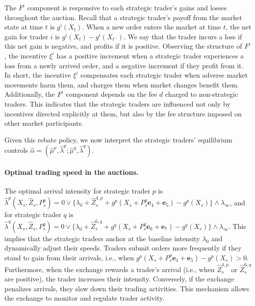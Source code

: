 \documentclass[12pt]{article}
\begin{document}
The $F^i$ component is responsive to each strategic trader's gains and losses throughout the auction. Recall that a strategic trader's payoff from the market state at time $t$ is $g^i(X_t)$. When a new order enters the market at time $t$, the net gain for trader $i$ is $g^i(X_t) - g^i(X_{t^-})$. We say that the trader incurs a loss if this net gain is negative, and profits if it is positive. Observing the structure of $F^i$, the incentive $\xi^i$ has a positive increment when a strategic trader experiences a loss from a newly arrived order, and a negative increment if they profit from it. In short, the incentive $\xi^i$ compensates each strategic trader when adverse market movements harm them, and charges them when market changes benefit them. Additionally, the $F^i$ component depends on the fee $d$ charged to non-strategic traders. This indicates that the strategic traders are influenced not only by incentives directed explicitly at them, but also by the fee structure imposed on other market participants.

Given this rebate policy, we now interpret the strategic traders' equilibrium controls $\hat{\alpha} = (\hat{\mu}^p, \hat{\lambda}^p ; \hat{\mu}^q, \hat{\lambda}^q)$. 

\paragraph{Optimal trading speed in the auctions.} 
The optimal arrival intensity for strategic trader $p$ is $\hat{\lambda}^p(X_s,\hat{Z}_s,P_s^p) = 0 \vee \{\lambda_0 + \hat{Z}_s^{4,p} + g^p(X_s + P_s^p\mathbf{e}_4 + \mathbf{e}_5) - g^p(X_s)\} \wedge \lambda_{\infty}$, and for strategic trader $q$ is $\hat{\lambda}^q(X_s,\hat{Z}_s,P_s^q) = 0 \vee \{\lambda_0 + \hat{Z}_s^{6,q} + g^q(X_s + P_s^q\mathbf{e}_6 + \mathbf{e}_7) - g^q(X_s)\} \wedge \lambda_{\infty}$. This implies that the strategic traders anchor at the baseline intensity $\lambda_0$ and dynamically adjust their speeds. Traders submit orders more frequently if they stand to gain from their arrivals, i.e., when $g^p(X_s + P_s^p\mathbf{e}_4 + \mathbf{e}_5) - g^p(X_s) > 0$. Furthermore, when the exchange rewards a trader's arrival (i.e., when $\hat{Z}^{4,p}_s$ or $\hat{Z}^{6,q}_s$ are positive), the trader increases their intensity. Conversely, if the exchange penalizes arrivals, they slow down their trading activities. This mechanism allows the exchange to monitor and regulate trader activity.
\end{document}
